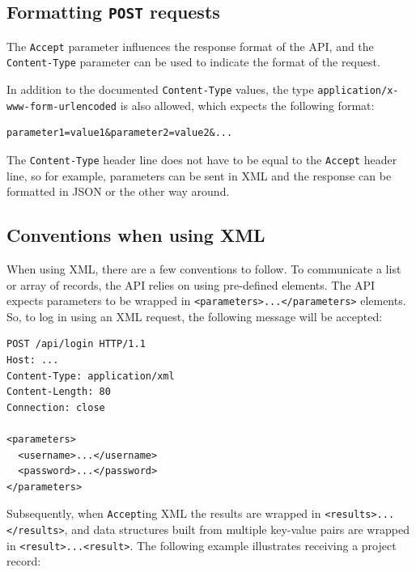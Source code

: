 \subsection{Formatting \texttt{POST} requests}

  The \texttt{Accept} parameter influences the response format of the API,
  and the \texttt{Content-Type} parameter can be used to indicate the format
  of the request.

  In addition to the documented \texttt{Content-Type} values, the type
  \texttt{application/x-www-form-urlencoded} is also allowed, which expects
  the following format:
\begin{siderules}
\begin{verbatim}
parameter1=value1&parameter2=value2&...
\end{verbatim}
\end{siderules}

  The \texttt{Content-Type} header line does not have to be equal to the
  \texttt{Accept} header line, so for example, parameters can be sent in
  XML and the response can be formatted in JSON or the other way around.

\subsection{Conventions when using XML}

\begin{sloppypar}
  When using XML, there are a few conventions to follow.  To communicate a list
  or array of records, the API relies on using pre-defined elements. The API
  expects parameters to be wrapped in \texttt{<parameters>...</parameters>}
  elements.  So, to log in using an XML request, the following message will be
  accepted:
\end{sloppypar}

\begin{siderules}
\begin{verbatim}
POST /api/login HTTP/1.1
Host: ...
Content-Type: application/xml
Content-Length: 80
Connection: close

<parameters>
  <username>...</username>
  <password>...</password>
</parameters>
\end{verbatim}
\end{siderules}

  Subsequently, when \texttt{Accept}ing XML the results are wrapped in
  \texttt{<results>...</results>}, and data structures built from multiple
  key-value pairs are wrapped in \texttt{<result>...<result>}.  The
  following example illustrates receiving a project record:

